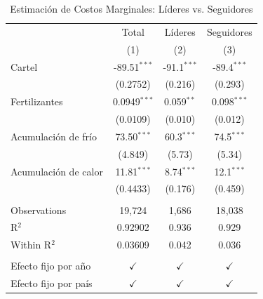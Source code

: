 \begin{table}[H]
   \caption{Estimación de Costos Marginales: Líderes vs. Seguidores}
   \bigskip
   \centering
   \begin{tabular}{lccc}
      \hline 
      \hline 
      \toprule
                            & Total & Líderes       & Seguidores \\   
                            & (1) & (2)           & (3)\\  
      \hline
      \midrule 
      Cartel             & -89.51$^{***}$ & -91.1$^{***}$ & -89.4$^{***}$\\   
                            & (0.2752) & (0.216)       & (0.293)\\   
      Fertilizantes  & 0.0949$^{***}$ & 0.059$^{**}$  & 0.098$^{***}$\\   
                            & (0.0109) & (0.010)       & (0.012)\\   
      Acumulación de frío      & 73.50$^{***}$ & 60.3$^{***}$  & 74.5$^{***}$\\   
                            & (4.849) & (5.73)        & (5.34)\\   
      Acumulación de calor      & 11.81$^{***}$ & 8.74$^{***}$  & 12.1$^{***}$\\   
                            & (0.4433) & (0.176)       & (0.459)\\   
       \\
      \hline
      Observations          & 19,724 & 1,686         & 18,038\\  
      R$^2$                 & 0.92902 & 0.936         & 0.929\\  
      Within R$^2$          & 0.03609 & 0.042         & 0.036\\  
       \\
      \hline
      Efecto fijo por año    & $\checkmark$ & $\checkmark$  & $\checkmark$\\   
      Efecto fijo por país & $\checkmark$ & $\checkmark$  & $\checkmark$\\   
      \bottomrule
   \end{tabular}
   \par \raggedright 
\end{table}




